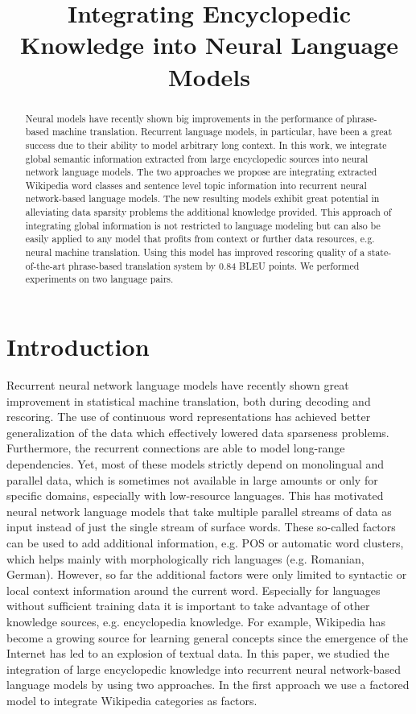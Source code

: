 \documentclass[a4paper]{article}
\title{Integrating Encyclopedic Knowledge into Neural Language Models}
\begin{document}
\maketitle
%
\begin{abstract}
Neural models have recently shown big improvements in the performance of phrase-based machine translation. Recurrent language models, in particular, have been a great success due to their ability to model arbitrary long context. In this work, we integrate global semantic information extracted from large encyclopedic sources into neural network language models. The two approaches we propose are integrating extracted Wikipedia word classes and sentence level topic information into recurrent neural network-based language models. 
The new resulting models exhibit great potential in alleviating data sparsity problems  the additional knowledge provided. This approach of integrating global information is not restricted to language modeling but can also be easily applied to any model that profits from context or further data resources, e.g. neural machine translation. Using this model has improved rescoring quality of a state-of-the-art phrase-based translation system by 0.84 BLEU points. We performed experiments on two language pairs.



\end{abstract}


%
\section{Introduction}
Recurrent neural network language models have recently shown great improvement in statistical machine translation, both during decoding and rescoring. The use of continuous word representations has achieved better generalization of the data which effectively lowered data sparseness problems. Furthermore, the recurrent connections are able to model long-range dependencies. Yet, most of these models strictly depend on monolingual and parallel data, which is sometimes not available in large amounts or only for specific domains, especially with low-resource languages.
This has motivated neural network language models that take multiple parallel streams of data as input instead of just the single stream of surface words. These so-called factors can be used to add additional information, e.g. POS or automatic word clusters, which helps mainly with morphologically rich languages (e.g. Romanian, German). However, so far the additional factors were only limited to syntactic or local context information around the current word. Especially for languages without sufficient training data it is important to take advantage of other knowledge sources, e.g. encyclopedia knowledge. For example, Wikipedia has become a growing source for learning general concepts since the emergence of the Internet has led to an explosion of textual data. 
In this paper, we studied the integration of large encyclopedic knowledge into recurrent neural network-based language models by using two approaches. 
In the first approach we use a factored model to integrate Wikipedia categories as factors. 
\end{document}
